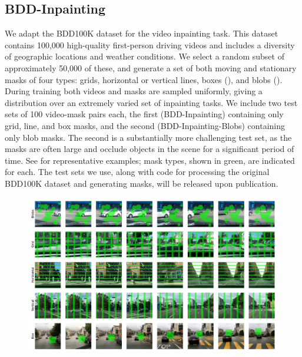 \subsection{BDD-Inpainting}
We adapt the BDD100K \citep{bdd100k} dataset for the video inpainting task. This dataset contains 100,000 high-quality first-person driving videos and includes a diversity of geographic locations and weather conditions. We select a random subset of approximately 50,000 
of these, and generate a set of both moving and stationary masks of four types: grids, horizontal or vertical lines, boxes (), and blobs (). During training both videos and masks are sampled uniformly, giving a distribution over an extremely varied set of inpainting tasks. We include two test sets of 100 video-mask pairs each, the first (BDD-Inpainting) containing only grid, line, and box masks, and the second (BDD-Inpainting-Blobs) containing only blob masks. The second is a substantially more challenging test set, as the masks are often large and occlude objects in the scene for a significant period of time. See  for representative examples; mask types, shown in green, are indicated for each. The test sets we use, along with code for processing the original BDD100K dataset and generating masks, will be released upon publication. 
\begin{figure}[t]
    \begin{center}
        \centering
        \captionsetup{type=figure}
        \includegraphics[width=\linewidth]{figures/dataset-examples/bdd-examples.pdf}
        \label{fig:bdd-examples}
    \end{center}
    \end{figure}
